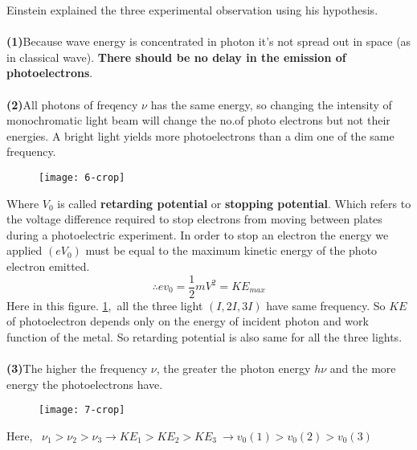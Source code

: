 Einstein explained the three experimental observation using his hypothesis.\\\\
\textbf{(1)}\quad Because wave energy is concentrated in photon it's not spread out in space (as in classical wave). \textbf{There should be no delay in the emission of photoelectrons}.\\\\
\textbf{(2)}\quad All photons of freqency $\nu$ has the same energy, so changing the intensity of monochromatic light beam will change the no.of photo electrons but not their energies. A bright light yields more photoelectrons than a dim one of the same frequency.
\begin{figure}[H]
	\centering
	\texttt{[image: 6-crop]}
	\caption{}
	\label{photo2}
\end{figure}
Where $V_0$ is called \textbf{retarding potential} or \textbf{stopping potential}. Which refers to the voltage difference required to stop electrons from moving between plates during a photoelectric experiment. In order to stop an electron the energy we applied $(eV_0)$ must be equal to the maximum kinetic energy of the photo electron emitted.
$$\therefore ev_0=\frac{1}{2}mV^2=KE_{max}$$
Here in this figure. \ref{photo2},\  all the three light $(I,2I,3I)$ have same frequency. So $KE$ of photoelectron depends only on the energy of incident photon and work function of the metal. So retarding potential is also same for all the three lights.\\\\
\textbf{(3)}\quad The higher the frequency $\nu$, the greater the photon energy $h\nu$ and the more energy the photoelectrons have.
\begin{figure}[H]
	\centering
	\texttt{[image: 7-crop]}
	\caption{}
	\label{photo3}
\end{figure} 
Here, \   $\nu_1>\nu_2>\nu_3 \rightarrow KE_1>KE_2>KE_3 \ \rightarrow v_0(1)>v_0(2)>v_0(3)$

